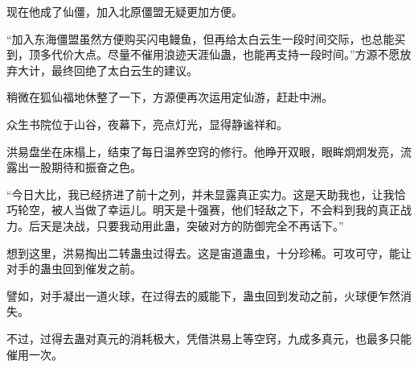 \begin{this_body}
现在他成了仙僵，加入北原僵盟无疑更加方便。

“加入东海僵盟虽然方便购买闪电鳗鱼，但再给太白云生一段时间交际，也总能买到，顶多代价大点。尽量不催用浪迹天涯仙蛊，也能再支持一段时间。”方源不愿放弃大计，最终回绝了太白云生的建议。

稍微在狐仙福地休整了一下，方源便再次运用定仙游，赶赴中洲。

众生书院位于山谷，夜幕下，亮点灯光，显得静谧祥和。

洪易盘坐在床榻上，结束了每日温养空窍的修行。他睁开双眼，眼眸炯炯发亮，流露出一股期待和振奋之色。

“今日大比，我已经挤进了前十之列，并未显露真正实力。这是天助我也，让我恰巧轮空，被人当做了幸运儿。明天是十强赛，他们轻敌之下，不会料到我的真正战力。后天是决战，只要我动用此蛊，突破对方的防御完全不再话下。”

想到这里，洪易掏出二转蛊虫过得去。这是宙道蛊虫，十分珍稀。可攻可守，能让对手的蛊虫回到催发之前。

譬如，对手凝出一道火球，在过得去的威能下，蛊虫回到发动之前，火球便乍然消失。

不过，过得去蛊对真元的消耗极大，凭借洪易上等空窍，九成多真元，也最多只能催用一次。

\end{this_body}

